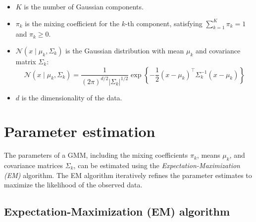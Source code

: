 \begin{itemize}
    \item \( K \) is the number of Gaussian components.

    \item \( \pi_k \) is the mixing coefficient for the \( k \)-th component, satisfying \( \sum_{k=1}^{K} \pi_k = 1 \) and \( \pi_k \geq 0 \).

    \item \( \mathcal{N}(x \mid \mu_k, \Sigma_k) \) is the Gaussian distribution with mean \( \mu_k \) and covariance matrix \( \Sigma_k \):
        \begin{equation*}
            \mathcal{N}(x \mid \mu_k, \Sigma_k)
            =
            \frac{1}{{(2\pi)}^{d/2} |\Sigma_k|^{1/2}}
            \exp \left\{ -\frac{1}{2}{(x - \mu_k)}^\top \Sigma_k^{-1} (x - \mu_k) \right\}
        \end{equation*}

    \item \( d \) is the dimensionality of the data.
\end{itemize}

\section{Parameter estimation}

The parameters of a GMM, including the mixing coefficients \( \pi_k \), means \( \mu_k \), and covariance matrices \( \Sigma_k \), can be estimated using the \textit{Expectation-Maximization (EM)} algorithm.
The EM algorithm iteratively refines the parameter estimates to maximize the likelihood of the observed data.

\subsection{Expectation-Maximization (EM) algorithm}


